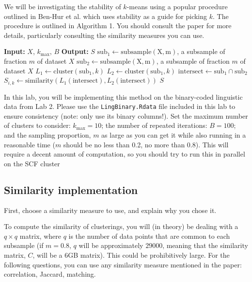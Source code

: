 \documentclass[letterpaper,12pt]{article}
\begin{document}
We will be investigating the stability of $k$-means using a popular procedure outlined in Ben-Hur et al. which uses stability as a guide for picking $k$. The procedure is outlined in Algorithm 1. You should consult the paper for more details, particularly consulting the similarity measures you can use.

\begin{algorithm}[h]
    \caption{Calculation of clustering similarities in $k$-means}
    \begin{algorithmic}
        \State \textbf{Input:} $X$, $k_\mathrm{max}$, $B$
        \State \textbf{Output:} $S$
                \State $\mathrm{sub}_1 \leftarrow \mathrm{subsample(X,m)}$, a subsample of fraction $m$ of dataset $X$
                \State $\mathrm{sub}_2 \leftarrow \mathrm{subsample(X,m)}$, a subsample of fraction $m$ of dataset $X$
                \State $L_1\leftarrow\mathrm{cluster}(\mathrm{sub}_1,k)$
                \State $L_2\leftarrow\mathrm{cluster}(\mathrm{sub}_1,k)$
                \State $\mathrm{intersect}\leftarrow\mathrm{sub}_1\cap\mathrm{sub}_2$
                \State $S_{i,k}\leftarrow\mathrm{similarity}(L_1(\mathrm{intersect}),L_2(\mathrm{intersect}))$
            \EndFor
        \EndFor
        \State \Return $S$
    \end{algorithmic}
\end{algorithm}

In this lab, you will be implementing this method on the binary-coded linguistic data from Lab 2. Please use the \texttt{LingBinary.Rdata} file included in this lab to ensure consistency (note: only use its binary columns!). Set the maximum number of clusters to consider: $k_{\mathrm{max}}=10$; the number of repeated iterations: $B=100$; and the sampling proportion, $m$ as large as you can get it while also running in a reasonable time ($m$ should be no less than 0.2, no more than 0.8). This will require a decent amount of computation, so you should try to run this in parallel on the SCF cluster

\subsection{Similarity implementation}

First, choose a similarity measure to use, and explain why you chose it.

To compute the similarity of clusterings, you will (in theory) be dealing with a $q\times q$ matrix, where $q$ is the number of data points that are common to each subsample (if $m = 0.8$, $q$ will be approximately $29000$, meaning that the similarity matrix, $C$, will be a 6GB matrix). This could be prohibitively large. For the following questions, you can use any similarity measure mentioned in the paper: correlation, Jaccard, matching.
\end{document}
